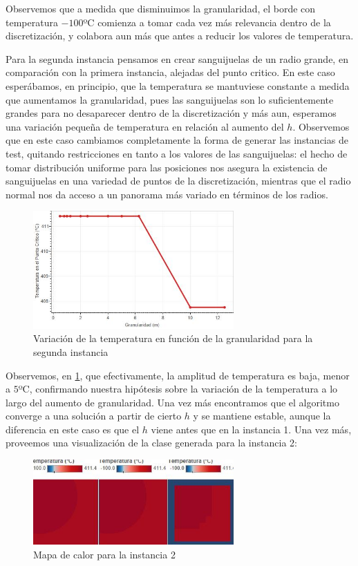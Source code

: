 Observemos que a medida que disminuimos la granularidad, el borde con temperatura $-100$ºC comienza a tomar cada vez más relevancia dentro de la discretización, y colabora aun más que antes a reducir los valores de temperatura.

Para la segunda instancia pensamos en crear sanguijuelas de un radio grande, en comparación con la primera instancia, alejadas del punto critico. En este caso esperábamos, en principio, que la temperatura se mantuviese constante a medida que aumentamos la granularidad, pues las sanguijuelas son lo suficientemente grandes para no desaparecer dentro de la discretización y más aun, esperamos una variación pequeña de temperatura en relación al aumento del $h$. Observemos que en este caso cambiamos completamente la forma de generar las instancias de test, quitando restricciones en tanto a los valores de las sanguijuelas: el hecho de tomar distribución uniforme para las posiciones nos asegura la existencia de sanguijuelas en una variedad de puntos de la discretización, mientras que el radio normal nos da acceso a un panorama más variado en términos de los radios.

\begin{figure}[h]
    \centering
    \includegraphics[width=0.685\textwidth]{experimento 1-2}
    \caption{Variación de la temperatura en función de la granularidad para la segunda instancia}
    \label{fig:exp12}
\end{figure}

Observemos, en \ref{fig:exp12}, que efectivamente, la amplitud de temperatura es baja, menor a $5$ºC, confirmando nuestra hipótesis sobre la variación de la temperatura a lo largo del aumento de granularidad. Una vez más encontramos que el algoritmo converge a una solución a partir de cierto $h$ y se mantiene estable, aunque la diferencia en este caso es que el $h$ viene antes que en la instancia 1. Una vez más, proveemos una visualización de la clase generada para la instancia 2:

\begin{figure}[h]
    \centering
    \includegraphics[width=0.685\textwidth]{Ejemplo Instancia 2}
    \caption{Mapa de calor para la instancia 2}
    \label{fig:exp12-vis}
\end{figure}


